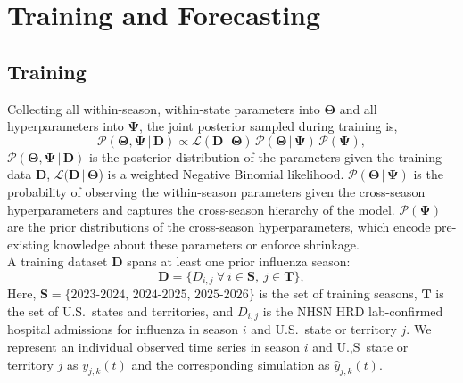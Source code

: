 \documentclass[11pt]{article}
\newcommand{\given}{\,|\,}
\begin{document}
\section{Training and Forecasting}
\subsection{Training}
 
Collecting all within-season, within-state parameters into $\bm{\Theta}$ and all hyperparameters into $\bm{\Psi}$, the joint posterior sampled during training is,
\begin{equation}
    \mathcal{P}(\bm{\Theta}, \bm{\Psi} \given \bm{D}) \propto \mathcal{L}(\bm{D} \given \bm{\Theta})\, \mathcal{P}(\bm{\Theta} \given \bm{\Psi})\, \mathcal{P}(\bm{\Psi}),
\end{equation}
$\mathcal{P}(\bm{\Theta}, \bm{\Psi} \given \bm{D})$ is the posterior distribution of the parameters given the training data $\bm{D}$, $\mathcal{L}(\bm{D} \given \bm{\Theta}$) is a weighted Negative Binomial likelihood. $\mathcal{P}\left( \bm{\Theta} \given \bm{\Psi} \right)$ is the probability of observing the within-season parameters given the cross-season hyperparameters and captures the cross-season hierarchy of the model. $\mathcal{P} \left(\bm{\Psi} \right)$ are the prior distributions of the cross-season hyperparameters, which encode pre-existing knowledge about these parameters or enforce shrinkage.\\

A training dataset $\bm{D}$ spans at least one prior influenza season:
\begin{equation}
    \bm{D} = \bigl\{ D_{i,j}\ \forall\ i \in \bm{S},\ j \in \bm{T} \bigr\},
\end{equation}
Here, $\bm{S} = \{2023\text{-}2024,\, 2024\text{-}2025,\, 2025\text{-}2026\}$ is the set of training seasons, $\bm{T}$ is the set of U.S.\ states and territories, and $D_{i,j}$ is the NHSN HRD lab-confirmed hospital admissions for influenza in season $i$ and U.S.\ state or territory $j$. We represent an individual observed time series in season $i$ and U.,S\ state or territory $j$ as $y_{j,k}(t)$ and the corresponding simulation as $\hat{y}_{j,k}(t)$.\\
 
\end{document}
